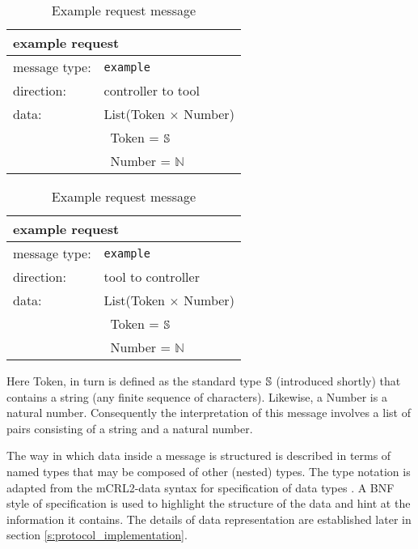 \documentclass{article}
\newcommand{\msg}[1]{\texttt{#1}}
\newcommand{\String}{\ensuremath \mathbb{S}\xspace}
\begin{document}
   \begin{table}[H]
    \begin{center}
     \begin{tabular}{|ll|}
      \hline
       \multicolumn{2}{|l|}{\textbf{example request}} \\
      \hline
       message type:    & \msg{example} \\
      \hline
       direction:       & controller to tool \\
      \hline
       data:            & List(Token $\times$ Number) \\
                        & \ Token  = $\String$ \\
                        & \ Number = $\mathbb{N}$ \\
      \hline
     \end{tabular}
     \begin{tabular}{|ll|}
      \hline
       \multicolumn{2}{|l|}{\textbf{example request}} \\
      \hline
       message type:    & \msg{example} \\
      \hline
       direction:       & tool to controller \\
      \hline
       data:            & List(Token $\times$ Number) \\
                        & \ Token  = $\String$ \\
                        & \ Number = $\mathbb{N}$ \\
      \hline
     \end{tabular}
     \vspace{-0.3cm}
    \end{center}
    \caption{Example request message}
    \label{table:example_message}
   \end{table}
   Here Token, in turn is defined as the standard type $\String$ (introduced
   shortly) that contains a string (any finite sequence of characters).
   Likewise, a Number is a natural number.  Consequently the interpretation of
   this message involves a list of pairs consisting of a string and a natural
   number.

   The way in which data inside a message is structured is described in terms
   of named types that may be composed of other (nested) types. The type
   notation is adapted from the mCRL2-data syntax for specification of data
   types \cite{groote_et_al:DSP:2007:862}. A BNF style of specification is used
   to highlight the structure of the data and hint at the information it
   contains.  The details of data representation are established later in
   section \ref{s:protocol_implementation}.
\end{document}
